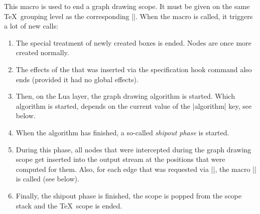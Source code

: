 \begin{command}{\pgfgdendscope}
  This macro is used to end a graph drawing scope. It must be given on
  the same \TeX\ grouping level as the corresponding
  |\pgfgdbeginscope|. When the macro is called, it triggers a lot of
  new calls:
  \begin{enumerate}
  \item The special treatment of newly created boxes is ended. Nodes
    are once more created normally.
  \item The effects of the  that was inserted via the
    specification hook command also ends (provided it had no global
    effects).
  \item Then, on the Lua layer, the graph drawing algorithm is
    started. Which algorithm is started, depends on the current value
    of the |algorithm| key, see below.
  \item When the algorithm has finished, a so-called \emph{shipout
      phase} is started.
  \item During this phase, all nodes that were intercepted during the
    graph drawing scope get inserted into the output stream at the
    positions that were computed for them. Also, for each edge that
    was requested via |\pgfgdedge|, the macro |\pgfgdedgecallback| is
    called (see below).
  \item Finally, the shipout phase is finished, the scope is popped
    from the scope stack and the \TeX\ scope is ended. 
  \end{enumerate}
\end{command}



